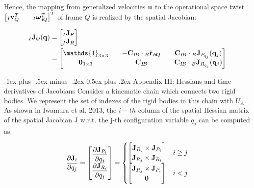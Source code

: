 \documentclass[10pt,landscape,a4paper]{article}
\makeatletter
\renewcommand{\section}{\@startsection{section}{1}{0mm}%
                               {-1ex plus -.5ex minus -.2ex}%
                                {0.5ex plus .2ex}%
                                {\normalfont\large\bfseries}}
\newcommand\identity{\mathds{1}}
\newcommand\poshat[3]{{}_#1\hat{\vr}_{#2\!#3}}
\newcommand\comat[2]{\vC_{#1\!#2}}
\newcommand\rotvel[3]{{}_#1\vom_{#2\!#3}}
\makeatother
\begin{document}
\begin{multicols}{2}
Hence, the mapping from generalized velocities $\mathbf u$ to the operational space twist $\begin{bmatrix}{}_I \vv_{Q}^T && \rotvel{I}{I}{Q}^T \end{bmatrix}^T$ of frame $Q$ is realized by the spatial Jacobian:

\begin{equation}
\begin{aligned}
{}_I \vJ_Q(\vq)
&=
\begin{bmatrix}
{}_I \vJ_P \\
{}_I \vJ_R
\end{bmatrix} \\
&=
\begin{bmatrix}
\identity_{3\times 3} && -\comat{I}{B} \cdot \poshat{B}{B}{Q} && \comat{I}{B} \cdot {}_B \vJ_{P_{q_j}}(\vq_j) \\
\mathbf{0}_{3 \times 3} && \comat{I}{B} && \comat{I}{B} \cdot {}_B \vJ_{R_{q_j}}(\vq_j)
\end{bmatrix}
\end{aligned}
\end{equation}

\section{Appendix III: Hessians and time derivatives of Jacobians}
Consider a kinematic chain which connects two rigid bodies. We represent the set of indexes of the rigid bodies in this chain with $U_A$. As shown in Iwamura et al. 2013, the $i-th$ column of the spatial Hessian matrix of the spatial Jacobian J w.r.t. the j-th configuration variable $q_j$ can be computed as:

\begin{equation}
\dfrac{\partial \mathbf J_i}{\partial q_j}
= \begin{bmatrix}
\dfrac{\partial \mathbf J_{P_i}}{\partial q_j} \\ \dfrac{\partial \mathbf J_{R_i}}{\partial q_j}
\end{bmatrix}
=
\begin{cases}
\begin{bmatrix}
\mathbf J_{R_j} \times \mathbf J_{P_i}\\ 
\mathbf J_{R_j} \times \mathbf J_{R_i}
\end{bmatrix} & i \ge j \\

\begin{bmatrix}
\mathbf J_{R_j} \times \mathbf J_{P_i} \\ 
\mathbf{0} \\
\end{bmatrix} & i < j \\


\end{cases}
\end{equation}
\end{multicols}
\end{document}

